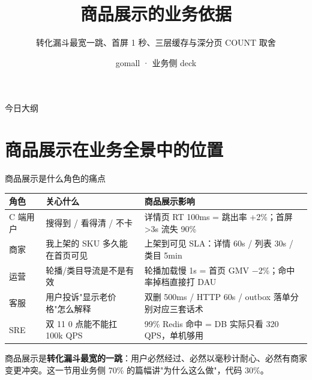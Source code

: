 \documentclass[aspectratio=169,11pt]{beamer}
\title{商品展示的业务依据}
\subtitle{转化漏斗最宽一跳、首屏 1 秒、三层缓存与深分页 COUNT 取舍}
\author{gomall · 业务侧 deck}
\date{}
\begin{document}
\maketitle

\begin{frame}[shrink]{今日大纲}
\tableofcontents
\end{frame}

\section{商品展示在业务全景中的位置}

\begin{frame}[shrink]{商品展示是什么角色的痛点}
\begin{tabular}{@{}p{16mm}p{42mm}p{42mm}@{}}
\toprule
角色 & 关心什么 & 商品展示影响 \\
\midrule
C 端用户 & 搜得到 / 看得清 / 不卡 & 详情页 RT 100ms = 跳出率 +2\%；首屏 \textgreater 3s 流失 90\% \\
商家     & 我上架的 SKU 多久能在首页可见 & 上架到可见 SLA：详情 60s / 列表 30s / 类目 5min \\
运营     & 轮播/类目导流是不是有效 & 轮播加载慢 1s = 首页 GMV $-$2\%；命中率掉档直接打 DAU \\
客服     & 用户投诉"显示老价格"怎么解释 & 双删 500ms / HTTP 60s / outbox 落单分别对应三套话术 \\
SRE      & 双 11 0 点能不能扛 100k QPS & 99\% Redis 命中 = DB 实际只看 320 QPS，单机够用 \\
\bottomrule
\end{tabular}
\vspace{2mm}
\small 商品展示是\textbf{转化漏斗最宽的一跳}：用户必然经过、必然以毫秒计耐心、必然有商家变更冲突。这一节用业务侧 70\% 的篇幅讲"为什么这么做"，代码 30\%。
\end{frame}
\end{document}
